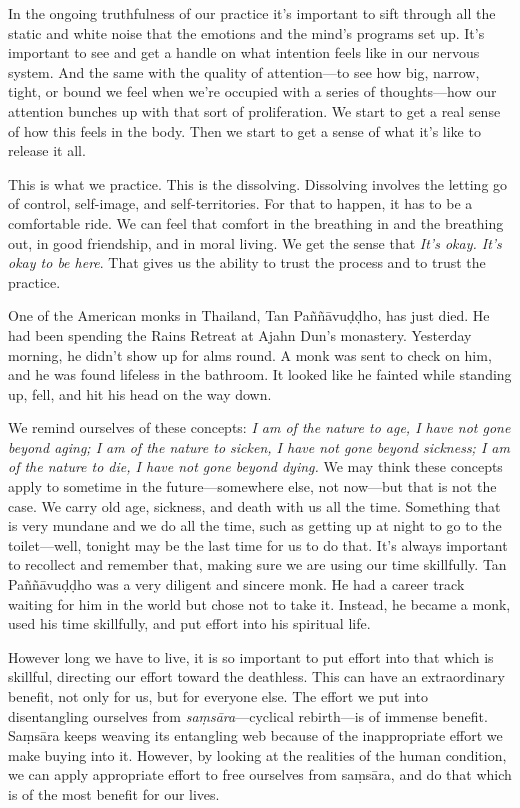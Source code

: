 In the ongoing truthfulness of our practice it's important to sift 
through all the static and white noise that the emotions and the mind's 
programs set up. It's important to see and get a handle on what 
intention feels like in our nervous system. And the same with the 
quality of attention---to see how big, narrow, tight, or bound we feel 
when we're occupied with a series of thoughts---how our attention 
bunches up with that sort of proliferation. We start to get a real 
sense of how this feels in the body. Then we start to get a sense of 
what it's like to release it all.

This is what we practice. This is the dissolving. Dissolving involves 
the letting go of control, self-image, and self-territories. For that 
to happen, it has to be a comfortable ride. We can feel that comfort in 
the breathing in and the breathing out, in good friendship, and in 
moral living. We get the sense that \emph{It's okay. It's okay to be 
here}. That gives us the ability to trust the process and to trust the 
practice.


One of the American monks in Thailand, Tan Paññāvuḍḍho, has just 
died. He had been spending the Rains Retreat at Ajahn Dun's monastery. 
Yesterday morning, he didn't show up for alms round. A monk was sent to 
check on him, and he was found lifeless in the bathroom. It looked like 
he fainted while standing up, fell, and hit his head on the way down.

We remind ourselves of these concepts: \emph{I am of the nature to age, 
I have not gone beyond aging; I am of the nature to sicken, I have not 
gone beyond sickness; I am of the nature to die, I have not gone beyond 
dying.} We may think these concepts apply to sometime in the 
future---somewhere else, not now---but that is not the case. We carry 
old age, sickness, and death with us all the time. Something that is 
very mundane and we do all the time, such as getting up at night to go 
to the toilet---well, tonight may be the last time for us to do that. 
It's always important to recollect and remember that, making sure we 
are using our time skillfully. Tan Paññāvuḍḍho was a very 
diligent and sincere monk. He had a career track waiting for him in the 
world but chose not to take it. Instead, he became a monk, used his 
time skillfully, and put effort into his spiritual life.

However long we have to live, it is so important to put effort into 
that which is skillful, directing our effort toward the deathless. This 
can have an extraordinary benefit, not only for us, but for everyone 
else. The effort we put into disentangling ourselves from 
\emph{saṃsāra}---cyclical rebirth---is of immense benefit. 
Saṃsāra keeps weaving its entangling web because of the 
inappropriate effort we make buying into it. However, by looking at the 
realities of the human condition, we can apply appropriate effort to 
free ourselves from saṃsāra, and do that which is of the most 
benefit for our lives.

